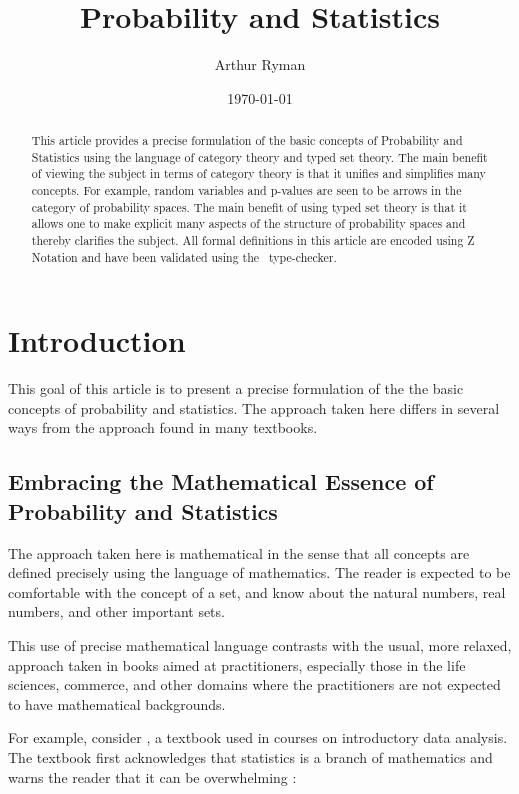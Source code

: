 \documentclass{article}
\title{Probability and Statistics}
\author{Arthur Ryman}
\date{\today}
\begin{document}


\maketitle

\begin{abstract}
This article provides a precise formulation of the basic concepts of Probability and Statistics
using the language of category theory and typed set theory.
The main benefit of viewing the subject in terms of category theory is that it unifies and simplifies many concepts.
For example, random variables and p-values are seen to be arrows in the category of probability spaces.
The main benefit of using typed set theory is that it allows one to make explicit many aspects of the structure of probability spaces and thereby clarifies the subject.
All formal definitions in this article are encoded using Z Notation and have been validated using the \fuzz\ type-checker.
\end{abstract}

\section{Introduction}

This goal of this article is to present a precise formulation of the the basic concepts of probability and statistics.
The approach taken here differs in several ways from the approach found in many textbooks.

\subsection{Embracing the Mathematical Essence of Probability and Statistics}

The approach taken here is mathematical in the sense that all concepts are defined precisely using the language of mathematics.
The reader is expected to be comfortable with the concept of a set, and know about the natural numbers, real numbers, and other important sets.

This use of precise mathematical language contrasts with the usual, more relaxed, approach taken in books aimed at practitioners, 
especially those in the life sciences, commerce, and other domains where the practitioners are not expected to have mathematical backgrounds.

For example, consider \cite{mendenhall:ips14}, a textbook used in courses on introductory data analysis.
The textbook first acknowledges that statistics is a branch of mathematics and warns the reader that it can be overwhelming
\cite[p3]{mendenhall:ips14}:
\end{document}

